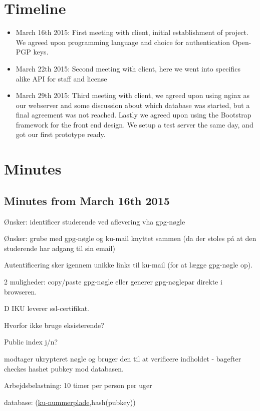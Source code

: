 \documentclass[11pt,a4paper]{report}
\let\OldItem\item
\newcommand{\SubItemStart}[1]{%
    \let\item\SubItemEnd
    \begin{SubItemList}[resume]%
        \OldItem #1%
}
\newcommand{\SubItemMiddle}[1]{%
    \OldItem #1%
}
\newcommand{\SubItemEnd}[1]{%
    \end{SubItemList}%
    \let\item\OldItem
    \item #1%
}
\newcommand*{\SubItem}[1]{%
    \let\SubItem\SubItemMiddle%
    \SubItemStart{#1}%
}%
\begin{document}
\begin{appendices}
\chapter{Timeline}
\begin{itemize}
  \item  March 16th 2015: First meeting with client, initial establishment of project. We agreed upon programming language and choice for authentication Open-PGP keys.
  \item  March 22th 2015: Second meeting with client, here we went into specifics alike API for staff and license
  \item March 29th 2015: Third meeting with client, we agreed upon using nginx as our webserver and some discussion about which database was started, but a final agreement was not reached. Lastly we agreed upon using the Bootstrap framework for the front end design. We setup a test server the same day, and got our first prototype ready.
\end{itemize}

\chapter{Minutes}
\section{Minutes from March 16th 2015}
\begin{itemize}
\item Ønsker: identificer studerende ved aflevering vha gpg-nøgle
\item Ønsker: grube med gpg-nøgle og ku-mail knyttet sammen (da der stoles på at den studerende har adgang til sin email)
\item Autentificering sker igennem unikke links til ku-mail (for at lægge gpg-nøgle op).
\SubItem 2 muligheder: copy/paste gpg-nøgle eller generer gpg-nøglepar direkte i browseren.
\item DIKU leverer ssl-certifikat.
\item Hvorfor ikke bruge eksisterende?
\item Public index j/n?
\item modtager ukrypteret nøgle og bruger den til at verificere indholdet - bagefter checkes hashet pubkey mod databasen.
\item Arbejdsbelastning: 10 timer per person per uger
\item database: (\underline{ku-nummerplade},hash(pubkey))
\end{itemize}

\end{appendices}
\end{document}
